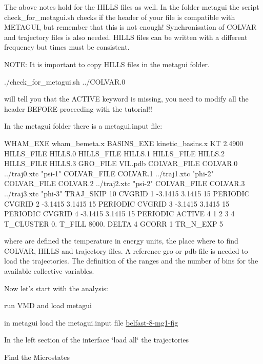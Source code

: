The above notes hold for the H\+I\+L\+L\+S files as well. In the folder metagui the script check\+\_\+for\+\_\+metagui.\+sh checks if the header of your file is compatible with M\+E\+T\+A\+G\+U\+I, but remember that this is not enough! Synchronisation of C\+O\+L\+V\+A\+R and trajectory files is also needed. H\+I\+L\+L\+S files can be written with a different frequency but times must be consistent.

N\+O\+T\+E\+: It is important to copy H\+I\+L\+L\+S files in the metagui folder.

\begin{DoxyVerb}./check_for_metagui.sh ../COLVAR.0
\end{DoxyVerb}


will tell you that the A\+C\+T\+I\+V\+E keyword is missing, you need to modify all the header B\+E\+F\+O\+R\+E proceeding with the tutorial!!

In the metagui folder there is a metagui.\+input file\+:

\begin{DoxyVerb}WHAM_EXE        wham_bemeta.x
BASINS_EXE      kinetic_basins.x
KT 2.4900
HILLS_FILE   HILLS.0  
HILLS_FILE   HILLS.1  
HILLS_FILE   HILLS.2  
HILLS_FILE   HILLS.3  
GRO_FILE     VIL.pdb 
COLVAR_FILE COLVAR.0 ../traj0.xtc "psi-1"
COLVAR_FILE COLVAR.1 ../traj1.xtc "phi-2"
COLVAR_FILE COLVAR.2 ../traj2.xtc "psi-2"
COLVAR_FILE COLVAR.3 ../traj3.xtc "phi-3"
TRAJ_SKIP 10
CVGRID 1  -3.1415 3.1415 15 PERIODIC
CVGRID 2  -3.1415 3.1415 15 PERIODIC
CVGRID 3  -3.1415 3.1415 15 PERIODIC
CVGRID 4  -3.1415 3.1415 15 PERIODIC
ACTIVE 4 1 2 3 4  
T_CLUSTER 0.
T_FILL    8000.
DELTA 4
GCORR 1
TR_N_EXP 5
\end{DoxyVerb}


where are defined the temperature in energy units, the place where to find C\+O\+L\+V\+A\+R, H\+I\+L\+L\+S and trajectory files. A reference gro or pdb file is needed to load the trajectories. The definition of the ranges and the number of bins for the available collective variables.

Now let's start with the analysis\+:


\begin{DoxyEnumerate}
\item run V\+M\+D and load metagui
\item in metagui load the metagui.\+input file \hyperlink{belfast-8_belfast-8-mg1-fig}{belfast-\/8-\/mg1-\/fig}
\item In the left section of the interface \char`\"{}load all\char`\"{} the trajectories
\item Find the Microstates
\end{DoxyEnumerate}

